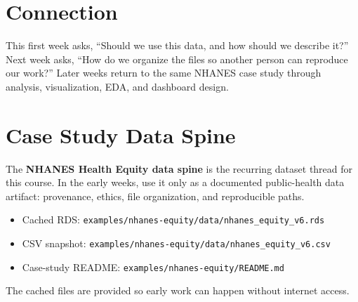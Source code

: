 \documentclass[
  letterpaper,
  DIV=11,
  numbers=noendperiod,
  oneside]{scrreprt}
\providecommand{\tightlist}{%
  \setlength{\itemsep}{0pt}\setlength{\parskip}{0pt}}
\begin{document}
\section*{Connection}\label{connection}


This first week asks, ``Should we use this data, and how should we
describe it?'' Next week asks, ``How do we organize the files so another
person can reproduce our work?'' Later weeks return to the same NHANES
case study through analysis, visualization, EDA, and dashboard design.

\section*{Case Study Data Spine}\label{case-study-data-spine}


The \textbf{NHANES Health Equity data spine} is the recurring dataset
thread for this course. In the early weeks, use it only as a documented
public-health data artifact: provenance, ethics, file organization, and
reproducible paths.

\begin{itemize}
\tightlist
\item
  Cached RDS:
  \texttt{examples/nhanes-equity/data/nhanes\_equity\_v6.rds}
\item
  CSV snapshot:
  \texttt{examples/nhanes-equity/data/nhanes\_equity\_v6.csv}
\item
  Case-study README: \texttt{examples/nhanes-equity/README.md}
\end{itemize}

The cached files are provided so early work can happen without internet
access.
\end{document}
